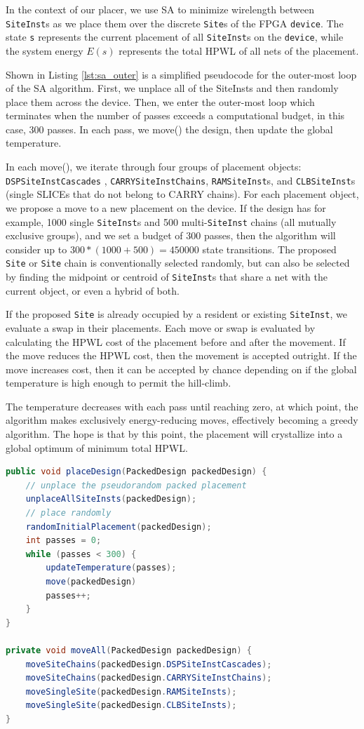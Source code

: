 In the context of our placer, we use SA to minimize wirelength between \texttt{SiteInst}s as we place them over the discrete \texttt{Site}s of the FPGA \texttt{device}.
The state \texttt{s} represents the current placement of all \texttt{SiteInst}s on the \texttt{device}, while the system energy \(E(s)\) represents the total HPWL of all nets of the placement. 

Shown in Listing \ref{lst:sa_outer} is a simplified pseudocode for the outer-most loop of the SA algorithm. 
First, we unplace all of the SiteInsts and then randomly place them across the device.
Then, we enter the outer-most loop which terminates when the number of passes exceeds a computational budget, in this case, 300 passes. 
In each pass, we move() the design, then update the global temperature. 

In each move(), we iterate through four groups of placement objects: \texttt{DSPSiteInstCascades} , \texttt{CARRYSiteInstChains}, \texttt{RAMSiteInst}s, and \texttt{CLBSiteInst}s (single SLICEs that do not belong to CARRY chains).
For each placement object, we propose a move to a new placement on the device. 
If the design has for example, 1000 single \texttt{SiteInst}s and 500 multi-\texttt{SiteInst} chains (all mutually exclusive groups), and we set a budget of 300 passes, then the algorithm will consider up to \(300 * (1000 + 500) = 450000\) state transitions.
The proposed \texttt{Site} or \texttt{Site} chain is conventionally selected randomly, but can also be selected by finding the midpoint or centroid of \texttt{SiteInst}s that share a net with the current object, or even a hybrid of both. 

If the proposed \texttt{Site} is already occupied by a resident or existing \texttt{SiteInst}, we evaluate a swap in their placements. 
Each move or swap is evaluated by calculating the HPWL cost of the placement before and after the movement.
If the move reduces the HPWL cost, then the movement is accepted outright.
If the move increases cost, then it can be accepted by chance depending on if the global temperature is high enough to permit the hill-climb.

The temperature decreases with each pass until reaching zero, at which point, the algorithm makes exclusively energy-reducing moves, effectively becoming a greedy algorithm. 
The hope is that by this point, the placement will crystallize into a global optimum of minimum total HPWL. 

\begin{lstlisting}[language=java, caption={SA pseudocode: outer loop}, label={lst:sa_outer}]
public void placeDesign(PackedDesign packedDesign) {
    // unplace the pseudorandom packed placement
    unplaceAllSiteInsts(packedDesign);
    // place randomly
    randomInitialPlacement(packedDesign);
    int passes = 0;
    while (passes < 300) {
        updateTemperature(passes);
        move(packedDesign)
        passes++;
    }
}

private void moveAll(PackedDesign packedDesign) {
    moveSiteChains(packedDesign.DSPSiteInstCascades);
    moveSiteChains(packedDesign.CARRYSiteInstChains);
    moveSingleSite(packedDesign.RAMSiteInsts);
    moveSingleSite(packedDesign.CLBSiteInsts);
}
\end{lstlisting}

